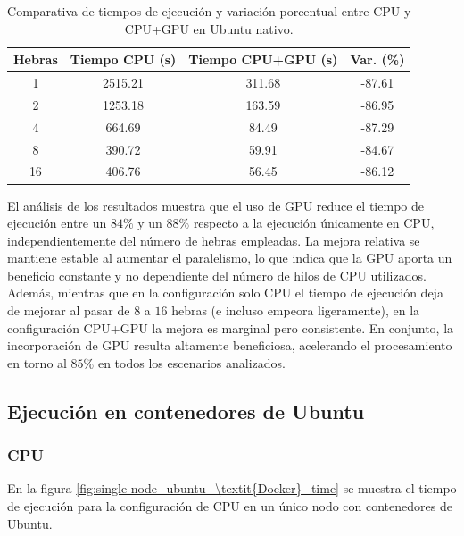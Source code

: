\begin{table}[ht]
    \centering
    \begin{tabular}{|c|c|c|c|}
        \hline
        \textbf{Hebras} & \textbf{Tiempo CPU (s)} & \textbf{Tiempo CPU+GPU (s)} & \textbf{Var. (\%)} \\
        \hline
        1               & 2515.21                 & 311.68                      & -87.61             \\
        2               & 1253.18                 & 163.59                      & -86.95             \\
        4               & 664.69                  & 84.49                       & -87.29             \\
        8               & 390.72                  & 59.91                       & -84.67             \\
        16              & 406.76                  & 56.45                       & -86.12             \\
        \hline
    \end{tabular}
    \caption{Comparativa de tiempos de ejecución y variación porcentual entre CPU y CPU+GPU en Ubuntu nativo.}
    \label{tab:single-node_ubuntu_cpu_vs_gpu_native}
\end{table}

El análisis de los resultados muestra que el uso de GPU reduce el tiempo de ejecución entre un $84\%$ y un $88\%$ respecto a la ejecución únicamente en CPU, independientemente del número de hebras empleadas. La mejora relativa se mantiene estable al aumentar el paralelismo, lo que indica que la GPU aporta un beneficio constante y no dependiente del número de hilos de CPU utilizados. Además, mientras que en la configuración solo CPU el tiempo de ejecución deja de mejorar al pasar de $8$ a $16$ hebras (e incluso empeora ligeramente), en la configuración CPU+GPU la mejora es marginal pero consistente. En conjunto, la incorporación de GPU resulta altamente beneficiosa, acelerando el procesamiento en torno al $85\%$ en todos los escenarios analizados.

\subsection{Ejecución en contenedores de Ubuntu}
\subsubsection{CPU}

En la figura \ref{fig:single-node_ubuntu_\textit{Docker}_time} se muestra el tiempo de ejecución para la configuración de CPU en un único nodo con contenedores de Ubuntu.

